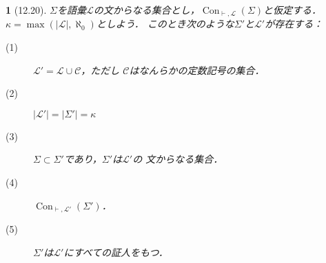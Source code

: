 \documentclass[a4j,10.5pt,oneside,openany]{jsbook}
\theoremstyle{mystyle}
\newtheorem{thm}{\color{DarkMidnightBlue}{定理}}[section]
\newcommand{\Con}{\operatorname{Con}} %
\begin{document}
	\begin{screen}
		\begin{thm}[12.20]
			$\Sigma$を語彙$\mathcal{L}$の文からなる集合とし，$\Con_{\vdash,\mathcal{L}}
			(\Sigma)$と仮定する．$\kappa = \max{(|\mathcal{L}|,\aleph_{0})}$としよう．
			このとき次のような$\Sigma'$と$\mathcal{L}'$が存在する：
			\begin{description}
				\item[(1)] $\mathcal{L}' = \mathcal{L} \cup \mathcal{C}$，ただし
					$\mathcal{C}$はなんらかの定数記号の集合．
				\item[(2)] $|\mathcal{L}'| = |\Sigma'| = \kappa$
				\item[(3)] $\Sigma \subset \Sigma'$であり，$\Sigma'$は$\mathcal{L}'$の
					文からなる集合．
				\item[(4)] $\Con_{\vdash,\mathcal{L}'}(\Sigma')$．
				\item[(5)] $\Sigma'$は$\mathcal{L}'$にすべての証人をもつ．
			\end{description}
		\end{thm}
	\end{screen}
\end{document}
